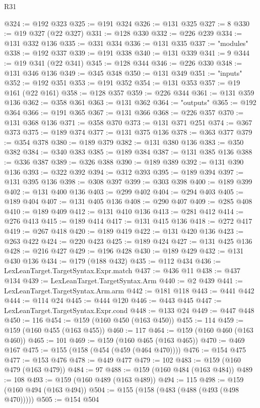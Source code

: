 \begin{lexlean}{R31}
\begin{coremodule}
@324 := @192 @323
@325 := @191 @324
@326 := @131 @325
@327 := 8
@330 := @19 @327 (@22 @327)
@331 := @128 @330
@332 := @226 @239
@334 := @131 @332 @136
@335 := @331 @334
@336 := @131 @335
@337 := "modules"
@338 := @192 @337
@339 := @191 @338
@340 := @131 @339
@341 := 9
@344 := @19 @341 (@22 @341)
@345 := @128 @344
@346 := @226 @330
@348 := @131 @346 @136
@349 := @345 @348
@350 := @131 @349
@351 := "inputs"
@352 := @192 @351
@353 := @191 @352
@354 := @131 @353
@357 := @19 @161 (@22 @161)
@358 := @128 @357
@359 := @226 @344
@361 := @131 @359 @136
@362 := @358 @361
@363 := @131 @362
@364 := "outputs"
@365 := @192 @364
@366 := @191 @365
@367 := @131 @366
@368 := @226 @357
@370 := @131 @368 @136
@371 := @358 @370
@373 := @131 @371 @251
@374 := @367 @373
@375 := @189 @374
@377 := @131 @375 @136
@378 := @363 @377
@379 := @354 @378
@380 := @189 @379
@382 := @131 @380 @136
@383 := @350 @382
@384 := @340 @383
@385 := @189 @384
@387 := @131 @385 @136
@388 := @336 @387
@389 := @326 @388
@390 := @189 @389
@392 := @131 @390 @136
@393 := @322 @392
@394 := @312 @393
@395 := @189 @394
@397 := @131 @395 @136
@398 := @308 @397
@399 := @303 @398
@400 := @189 @399
@402 := @131 @400 @136
@403 := @299 @402
@404 := @294 @403
@405 := @189 @404
@407 := @131 @405 @136
@408 := @290 @407
@409 := @285 @408
@410 := @189 @409
@412 := @131 @410 @136
@413 := @281 @412
@414 := @276 @413
@415 := @189 @414
@417 := @131 @415 @136
@418 := @272 @417
@419 := @267 @418
@420 := @189 @419
@422 := @131 @420 @136
@423 := @263 @422
@424 := @220 @423
@425 := @189 @424
@427 := @131 @425 @136
@428 := @216 @427
@429 := @196 @428
@430 := @189 @429
@432 := @131 @430 @136
@434 := @179 (@188 @432)
@435 := @112 @434
@436 := LexLeanTarget.TargetSyntax.Expr.match
@437 := @436 @11
@438 := @437 @134
@439 := LexLeanTarget.TargetSyntax.Arm
@440 := @2 @439
@441 := LexLeanTarget.TargetSyntax.Arm.arm
@442 := @181 @118
@443 := @441 @442
@444 := @114 @24
@445 := @444 @120
@446 := @443 @445
@447 := LexLeanTarget.TargetSyntax.Expr.cond
@448 := @133 @24
@449 := @447 @448
@450 := 116
@454 := @159 (@160 @450 (@163 @450))
@455 := 114
@459 := @159 (@160 @455 (@163 @455))
@460 := 117
@464 := @159 (@160 @460 (@163 @460))
@465 := 101
@469 := @159 (@160 @465 (@163 @465))
@470 := @469 @167
@475 := @155 (@158 (@454 (@459 (@464 @470))))
@476 := @154 @475
@477 := @153 @476
@478 := @449 @477
@479 := 102
@483 := @159 (@160 @479 (@163 @479))
@484 := 97
@488 := @159 (@160 @484 (@163 @484))
@489 := 108
@493 := @159 (@160 @489 (@163 @489))
@494 := 115
@498 := @159 (@160 @494 (@163 @494))
@504 := @155 (@158 (@483 (@488 (@493 (@498 @470)))))
@505 := @154 @504

\end{coremodule}
\end{lexlean}
